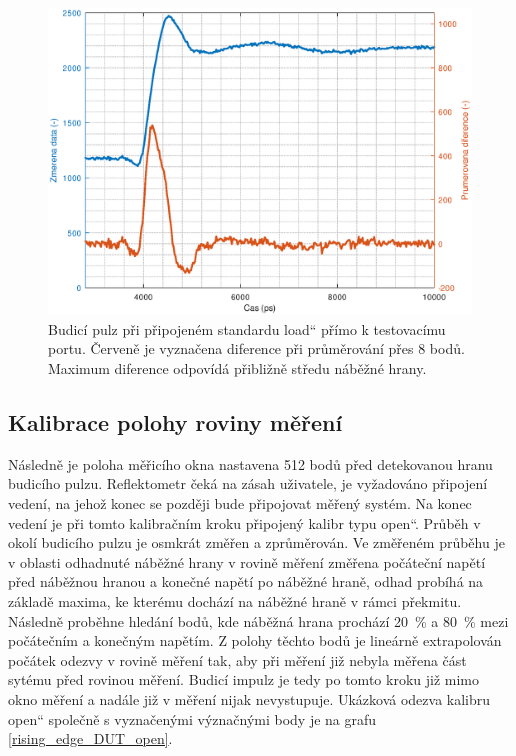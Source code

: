 \begin{figure}[H]
\includegraphics[width=\textwidth,keepaspectratio]{images/rising_edge_port_load.eps}\caption{Budicí pulz při připojeném standardu \quotedblbase load\textquotedblleft{} přímo k testovacímu portu. Červeně je vyznačena diference při průměrování přes 8 bodů. Maximum diference odpovídá přibližně středu náběžné hrany.}\label{rising_edge_port_load}
\end{figure}

\subsection{Kalibrace polohy roviny měření}
Následně je poloha měřicího okna nastavena 512 bodů před detekovanou hranu budicího pulzu. Reflektometr čeká na zásah uživatele, je vyžadováno připojení vedení, na jehož konec se později bude připojovat měřený systém. Na konec vedení je při tomto kalibračním kroku připojený kalibr typu \quotedblbase open\textquotedblleft. Průběh v okolí budicího pulzu je osmkrát změřen a zprůměrován. Ve změřeném průběhu je v oblasti odhadnuté náběžné hrany v rovině měření změřena počáteční napětí před náběžnou hranou a konečné napětí po náběžné hraně, odhad probíhá na základě maxima, ke kterému dochází na náběžné hraně v rámci překmitu. Následně proběhne hledání bodů, kde náběžná hrana prochází \SI{20}{\percent} a \SI{80}{\percent} mezi počátečním a konečným napětím. Z polohy těchto bodů je lineárně extrapolován počátek odezvy v rovině měření tak, aby při měření již nebyla měřena část sytému před rovinou měření. Budicí impulz je tedy po tomto kroku již mimo okno měření a nadále již v měření nijak nevystupuje. Ukázková odezva kalibru \quotedblbase open\textquotedblleft{} společně s vyznačenými význačnými body je na grafu \ref{rising_edge_DUT_open}.

